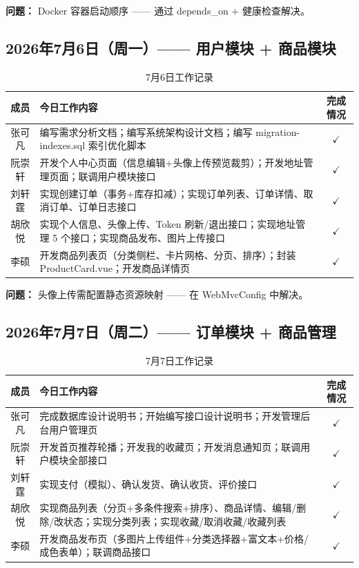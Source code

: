 \documentclass[12pt,a4paper,UTF8]{ctexart}
\begin{document}
\textbf{问题：} Docker 容器启动顺序 —— 通过 depends\_on + 健康检查解决。

\subsection{2026年7月6日（周一）—— 用户模块 + 商品模块}

\begin{table}[H]
\centering
\caption{7月6日工作记录}
\begin{tabularx}{\textwidth}{c X c}
\toprule
\textbf{成员} & \textbf{今日工作内容} & \textbf{完成情况} \\
\midrule
张可凡 & 编写需求分析文档；编写系统架构设计文档；编写 migration-indexes.sql 索引优化脚本 & $\checkmark$ \\
\hline
阮崇轩 & 开发个人中心页面（信息编辑+头像上传预览裁剪）；开发地址管理页面；联调用户模块接口 & $\checkmark$ \\
\hline
刘轩霆 & 实现创建订单（事务+库存扣减）；实现订单列表、订单详情、取消订单、订单日志接口 & $\checkmark$ \\
\hline
胡欣悦 & 实现个人信息、头像上传、Token 刷新/退出接口；实现地址管理 5 个接口；实现商品发布、图片上传接口 & $\checkmark$ \\
\hline
李硕 & 开发商品列表页（分类侧栏、卡片网格、分页、排序）；封装 ProductCard.vue；开发商品详情页 & $\checkmark$ \\
\bottomrule
\end{tabularx}
\end{table}

\textbf{问题：} 头像上传需配置静态资源映射 —— 在 WebMvcConfig 中解决。

\subsection{2026年7月7日（周二）—— 订单模块 + 商品管理}

\begin{table}[H]
\centering
\caption{7月7日工作记录}
\begin{tabularx}{\textwidth}{c X c}
\toprule
\textbf{成员} & \textbf{今日工作内容} & \textbf{完成情况} \\
\midrule
张可凡 & 完成数据库设计说明书；开始编写接口设计说明书；开发管理后台用户管理页 & $\checkmark$ \\
\hline
阮崇轩 & 开发首页推荐轮播；开发我的收藏页；开发消息通知页；联调用户模块全部接口 & $\checkmark$ \\
\hline
刘轩霆 & 实现支付（模拟）、确认发货、确认收货、评价接口 & $\checkmark$ \\
\hline
胡欣悦 & 实现商品列表（分页+多条件搜索+排序）、商品详情、编辑/删除/改状态；实现分类列表；实现收藏/取消收藏/收藏列表 & $\checkmark$ \\
\hline
李硕 & 开发商品发布页（多图片上传组件+分类选择器+富文本+价格/成色表单）；联调商品接口 & $\checkmark$ \\
\bottomrule
\end{tabularx}
\end{table}
\end{document}
